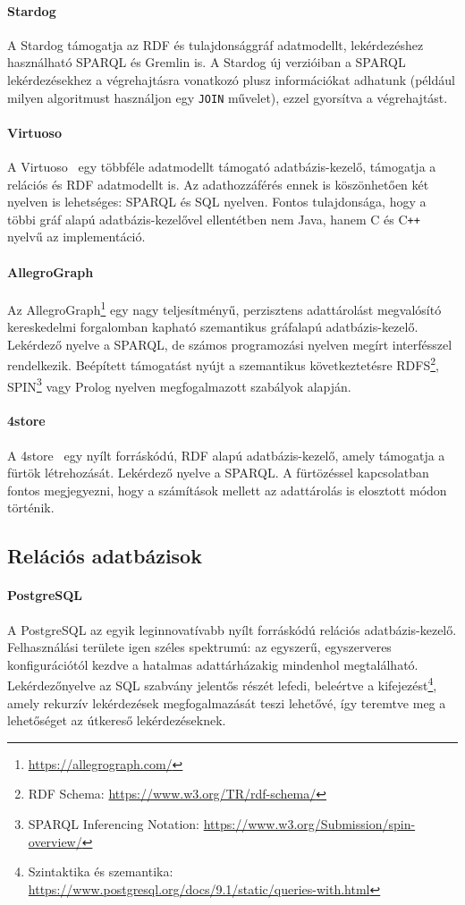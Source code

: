 \paragraph{Stardog} A Stardog támogatja az RDF és tulajdonsággráf adatmodellt, lekérdezéshez használható SPARQL és Gremlin is. A Stardog új verzióiban a SPARQL lekérdezésekhez a végrehajtásra vonatkozó plusz információkat adhatunk (például milyen algoritmust használjon egy \texttt{JOIN} művelet), ezzel gyorsítva a végrehajtást.

\paragraph{Virtuoso} A Virtuoso~\cite{DBLP:books/sp/virgilio09/ErlingM09} egy többféle adatmodellt támogató adatbázis-kezelő, támogatja a relációs és RDF adatmodellt is. Az adathozzáférés ennek is köszönhetően két nyelven is lehetséges: SPARQL és SQL nyelven. Fontos tulajdonsága, hogy a többi gráf alapú adatbázis-kezelővel ellentétben nem Java, hanem C és C\texttt{++} nyelvű az implementáció.

\paragraph{AllegroGraph} Az AllegroGraph\footnote{\url{https://allegrograph.com/}} egy nagy teljesítményű, perzisztens adattárolást megvalósító kereskedelmi forgalomban kapható szemantikus gráfalapú adatbázis-kezelő. Lekérdező nyelve a SPARQL, de számos programozási nyelven megírt interfésszel rendelkezik. Beépített támogatást nyújt a szemantikus következtetésre RDFS\footnote{RDF Schema: \url{https://www.w3.org/TR/rdf-schema/}}, SPIN\footnote{SPARQL Inferencing Notation: \url{https://www.w3.org/Submission/spin-overview/}} vagy Prolog nyelven megfogalmazott szabályok alapján. 

\paragraph{4store} A 4store~\cite{harris20094store} egy nyílt forráskódú, RDF alapú adatbázis-kezelő, amely támogatja a fürtök létrehozását. Lekérdező nyelve a SPARQL. A fürtözéssel kapcsolatban fontos megjegyezni, hogy a számítások mellett az adattárolás is elosztott módon történik.

\subsection{Relációs adatbázisok}
\paragraph{PostgreSQL} A PostgreSQL az egyik leginnovatívabb nyílt forráskódú relációs adatbázis-kezelő. Felhasználási területe igen széles spektrumú: az egyszerű, egyszerveres konfigurációtól kezdve a hatalmas adattárházakig mindenhol megtalálható. Lekérdezőnyelve az SQL szabvány jelentős részét lefedi, beleértve a  kifejezést\footnote{Szintaktika és szemantika: \url{https://www.postgresql.org/docs/9.1/static/queries-with.html}}, amely rekurzív lekérdezések megfogalmazását teszi lehetővé, így teremtve meg a lehetőséget az útkereső lekérdezéseknek.

